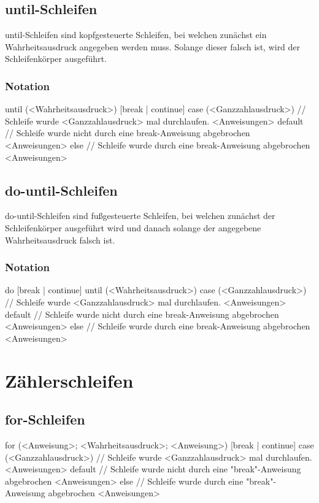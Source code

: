\subsection{until-Schleifen}
until-Schleifen sind kopfgesteuerte Schleifen, bei welchen zunächst ein Wahrheitsausdruck angegeben werden muss.
Solange dieser falsch ist, wird der Schleifenkörper ausgeführt.

\subsubsection{Notation}
until (<Wahrheitsausdruck>)
	[break | continue]
case (<Ganzzahlausdruck>) // Schleife wurde <Ganzzahlausdruck> mal durchlaufen.
	<Anweisungen>
default // Schleife wurde nicht durch eine break-Anweisung abgebrochen
	<Anweisungen>
else // Schleife wurde durch eine break-Anweisung abgebrochen
	<Anweisungen>

\subsection{do-until-Schleifen}
do-until-Schleifen sind fußgesteuerte Schleifen, bei welchen zunächst der Schleifenkörper ausgeführt wird und danach
solange der angegebene Wahrheitsausdruck falsch ist.

\subsubsection{Notation}
do
	[break | continue]
until (<Wahrheitsausdruck>)
case (<Ganzzahlausdruck>) // Schleife wurde <Ganzzahlausdruck> mal durchlaufen.
	<Anweisungen>
default // Schleife wurde nicht durch eine break-Anweisung abgebrochen
	<Anweisungen>
else // Schleife wurde durch eine break-Anweisung abgebrochen
	<Anweisungen>

\section{Zählerschleifen}

\subsection{for-Schleifen}
for (<Anweisung>; <Wahrheitsausdruck>; <Anweisung>)
	[break | continue]
case (<Ganzzahlausdruck>) // Schleife wurde <Ganzzahlausdruck> mal durchlaufen.
	<Anweisungen>
default // Schleife wurde nicht durch eine "break"-Anweisung abgebrochen
	<Anweisungen>
else // Schleife wurde durch eine "break"-Anweisung abgebrochen
	<Anweisungen>

